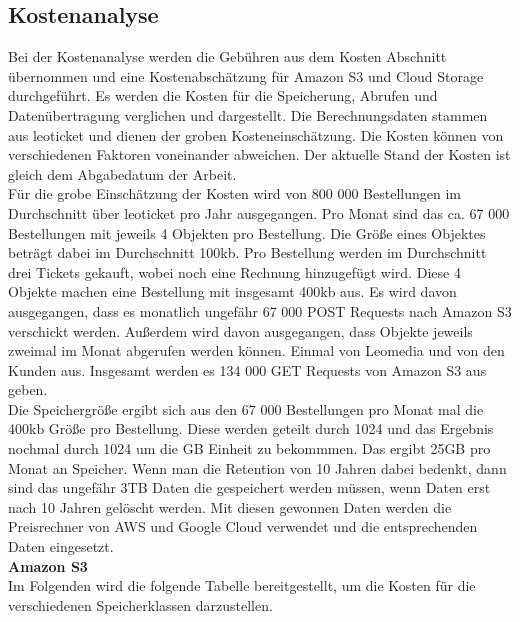 \newpage

\subsection{Kostenanalyse}

Bei der Kostenanalyse werden die Gebühren aus dem Kosten Abschnitt übernommen und eine Kostenabschätzung für Amazon S3 und Cloud Storage durchgeführt. Es werden die Kosten für die Speicherung, Abrufen und Datenübertragung verglichen und dargestellt. Die Berechnungsdaten stammen aus leoticket und dienen der groben Kosteneinschätzung. Die Kosten können von verschiedenen Faktoren voneinander abweichen. Der aktuelle Stand der Kosten ist gleich dem Abgabedatum der Arbeit.\\

Für die grobe Einschätzung der Kosten wird von 800 000 Bestellungen im Durchschnitt über leoticket pro Jahr ausgegangen. Pro Monat sind das ca. 67 000 Bestellungen mit jeweils 4 Objekten pro Bestellung. Die Größe eines Objektes beträgt dabei im Durchschnitt 100kb. Pro Bestellung werden im Durchschnitt drei Tickets gekauft, wobei noch eine Rechnung hinzugefügt wird. Diese 4 Objekte machen eine Bestellung mit insgesamt 400kb aus. Es wird davon ausgegangen, dass es monatlich ungefähr 67 000 POST Requests nach Amazon S3 verschickt werden. Außerdem wird davon ausgegangen, dass Objekte jeweils zweimal im Monat abgerufen werden können. Einmal von Leomedia und von den Kunden aus. Insgesamt werden es 134 000 GET Requests von Amazon S3 aus geben.\\

Die Speichergröße ergibt sich aus den 67 000 Bestellungen pro Monat mal die 400kb Größe pro Bestellung. Diese werden geteilt durch 1024 und das Ergebnis nochmal durch 1024 um die GB Einheit zu bekommmen. Das ergibt 25GB pro Monat an Speicher. Wenn man die Retention von 10 Jahren dabei bedenkt, dann sind das ungefähr 3TB Daten die gespeichert werden müssen, wenn Daten erst nach 10 Jahren gelöscht werden. Mit diesen gewonnen Daten werden die Preisrechner von AWS und Google Cloud verwendet und die entsprechenden Daten eingesetzt.\\


\textbf{Amazon S3}\\

Im Folgenden wird die folgende Tabelle bereitgestellt, um die Kosten für die verschiedenen Speicherklassen darzustellen.

